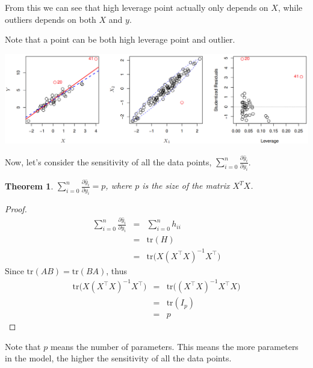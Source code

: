 \documentclass{article}
\theoremstyle{MyNonumberplain}
\theoremstyle{break}
\newtheorem*{proof}{Proof. }
\newcommand{\T}{^\intercal}
\newcommand{\inv}{^{-1}}
\newcommand{\pd}[2]{\frac{\partial {#1}}{\partial {#2}}}
\newcommand{\tr}{\text{tr}}
\theoremstyle{break}
\newtheorem{theorem}{Theorem}[section]
\begin{document}
From this we can see that high leverage point actually only depends on $X$, while outliers depends on both $X$ and $y$.

Note that a point can be both high leverage point and outlier.

\begin{center}
    \includegraphics*[scale=0.24]{Images/img12.png}
\end{center}

Now, let's consider the sensitivity of all the data points, $\sum_{i=0}^n \pd{\hat y_i}{y_i}$. 

\begin{thmbox}
    \begin{theorem}
        \vphantom{.}

        $\sum_{i=0}^n \pd{\hat y_i}{y_i}=p$, where $p$ is the size of the matrix $X^T X$.
    \end{theorem}
    \begin{prfbox}
        \begin{proof}
            \begin{eqnarray*}
                \sum_{i=0}^n \pd{\hat y_i}{y_i} &=& \sum_{i=0}^n h_{ii}\\
                                                &=& \tr(H)\\
                                                &=& \tr\biggl(X(X\T X)\inv X\T\biggr)
            \end{eqnarray*}
            Since $\tr(AB)=\tr(BA)$, thus
            \begin{eqnarray*}
                \tr\biggl(X(X\T X)\inv X\T\biggr) &=& \tr\biggl((X\T X)\inv X\T X\biggr)\\
                                                  &=& \tr(I_p)\\
                                                  &=& p
            \end{eqnarray*}
        \end{proof}
    \end{prfbox}
\end{thmbox} 

Note that $p$ means the number of parameters. This means the more parameters in the model, the
higher the sensitivity of all the data points.
\end{document}
